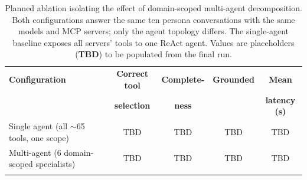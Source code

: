 \begin{table}[ht]
\begin{center}
\begin{minipage}{\textwidth}
\caption[Multi-agent vs.\ single-agent ablation (placeholder)]{Planned ablation isolating the effect of domain-scoped multi-agent decomposition. Both configurations answer the same ten persona conversations with the same models and MCP servers; only the agent topology differs. The single-agent baseline exposes all servers' tools to one ReAct agent. Values are placeholders (\textbf{TBD}) to be populated from the final run.}\label{tab:ablation}
\begin{tabularx}{\textwidth}{Xcccc}
\toprule
\textbf{Configuration} & \textbf{Correct tool} & \textbf{Complete-} & \textbf{Grounded} & \textbf{Mean} \\
 & \textbf{selection} & \textbf{ness} & & \textbf{latency (s)} \\
\midrule
Single agent (all $\sim$65 tools, one scope) & TBD & TBD & TBD & TBD \\
\addlinespace
Multi-agent (6 domain-scoped specialists) & TBD & TBD & TBD & TBD \\
\botrule
\end{tabularx}
\end{minipage}
\end{center}
\end{table}
